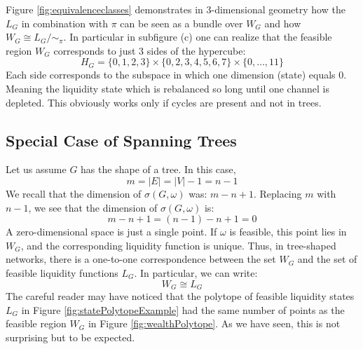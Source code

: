 \documentclass[10pt,twocolumn]{article}
\begin{document}
Figure \ref{fig:equivalenceclasses} demonstrates in $3$-dimensional geometry how the $L_G$ in combination with $\pi$ can be seen as a bundle over $W_G$ and how $W_G\cong L_G/\sim_\pi$.
In particular in subfigure (c) one can realize that the feasible region $W_G$ corresponds to just $3$ sides of the hypercube:
$$H_G=\{0,1,2,3\}\times\{0,2,3,4,5,6,7\}\times\{0,\dots,11\}$$
Each side corresponds to the subspace in which one dimension (state) equals $0$.
Meaning the liquidity state which is rebalanced so long until one channel is depleted. This obviously works only if cycles are present and not in trees.

\subsection{Special Case of Spanning Trees}


Let us assume \(G\) has the shape of a tree. In this case,
\[ m = |E| = |V| - 1 = n - 1 \]
We recall that the dimension of \(\sigma(G, \omega)\) was: \(m - n + 1\). Replacing \(m\) with \(n - 1\), we see that the dimension of \(\sigma(G, \omega)\) is:
\[ m - n + 1 = (n - 1) - n + 1 = 0 \]
A zero-dimensional space is just a single point. If \(\omega\) is feasible, this point lies in \(W_G\), and the corresponding liquidity function is unique. Thus, in tree-shaped networks, there is a one-to-one correspondence between the set \(W_G\) and the set of feasible liquidity functions \(L_G\). In particular, we can write:
\[ W_G \cong L_G \]
The careful reader may have noticed that the polytope of feasible liquidity states \(L_G\) in Figure \ref{fig:statePolytopeExample} had the same number of points as the feasible region \(W_G\) in Figure \ref{fig:wealthPolytope}. As we have seen, this is not surprising but to be expected.
\end{document}
